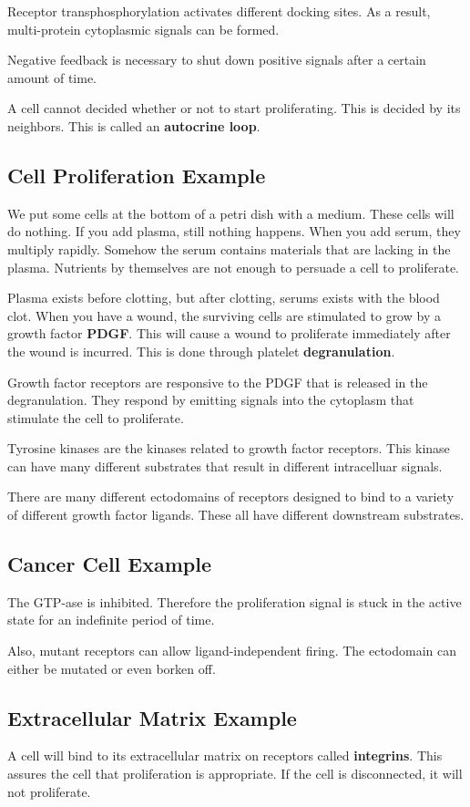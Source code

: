 \documentclass{article}
\begin{document}
Receptor transphosphorylation activates different docking sites. As a result,
multi-protein cytoplasmic signals can be formed.

Negative feedback is necessary to shut down positive signals after a certain
amount of time.

A cell cannot decided whether or not to start proliferating. This is decided by
its neighbors. This is called an \textbf{autocrine loop}.

\subsection{Cell Proliferation Example}

We put some cells at the bottom of a petri dish with a medium. These cells will
do nothing. If you add plasma, still nothing happens. When you add serum, they
multiply rapidly. Somehow the serum contains materials that are lacking in the
plasma. Nutrients by themselves are not enough to persuade a cell to
proliferate.

Plasma exists before clotting, but after clotting, serums exists with the blood
clot. When you have a wound, the surviving cells are stimulated to grow by a
growth factor \textbf{PDGF}. This will cause a wound to proliferate immediately
after the wound is incurred. This is done through platelet
\textbf{degranulation}.

Growth factor receptors are responsive to the PDGF that is released in the
degranulation. They respond by emitting signals into the cytoplasm that
stimulate the cell to proliferate. 

Tyrosine kinases are the kinases related to growth factor receptors. This kinase
can have many different substrates that result in different intracelluar
signals.

There are many different ectodomains of receptors designed to bind to a variety
of different growth factor ligands. These all have different downstream
substrates.

\subsection{Cancer Cell Example}

The GTP-ase is inhibited. Therefore the proliferation signal is stuck in the
active state for an indefinite period of time.

Also, mutant receptors can allow ligand-independent firing. The ectodomain can
either be mutated or even borken off.

\subsection{Extracellular Matrix Example}

A cell will bind to its extracellular matrix on receptors called
\textbf{integrins}. This assures the cell that proliferation is appropriate. If
the cell is disconnected, it will not proliferate.
\end{document}
